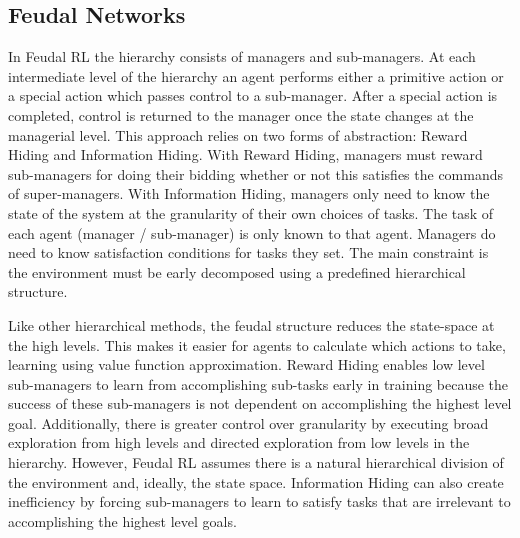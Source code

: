 \subsection{Feudal Networks}

In Feudal RL the hierarchy consists
of managers and sub-managers. At each intermediate level of the hierarchy an agent performs
either a primitive action or
a special action which passes control to a sub-manager. After a special action
is completed, control is
returned to the manager once the state changes at the managerial level. This
approach relies on two
forms of abstraction: Reward Hiding and Information Hiding. \cite{Dayan}
With Reward Hiding, managers must reward sub-managers for doing their bidding whether or not this
satisfies the commands of super-managers. With Information Hiding, managers only need to know the state of the system at the granularity of their own choices of tasks. The task of each agent (manager / sub-manager) is only known to that agent. Managers do need to know satisfaction conditions for tasks they set. The main constraint is the environment must be early
decomposed using a predefined hierarchical structure.

Like other hierarchical methods, the feudal structure reduces the state-space at the high levels.
This makes it easier for agents to calculate which actions to take, learning using value function approximation.
Reward Hiding enables low level sub-managers to learn from accomplishing sub-tasks early in training
because the success of these sub-managers is not dependent on accomplishing the highest level goal.
Additionally, there is  greater control over granularity by executing broad exploration from high levels
and directed exploration from low levels in the hierarchy. However, Feudal RL assumes there is a natural hierarchical division of the environment and, ideally, the state space. Information Hiding can also create inefficiency by forcing sub-managers to learn to satisfy tasks that are irrelevant to accomplishing the highest level goals.


